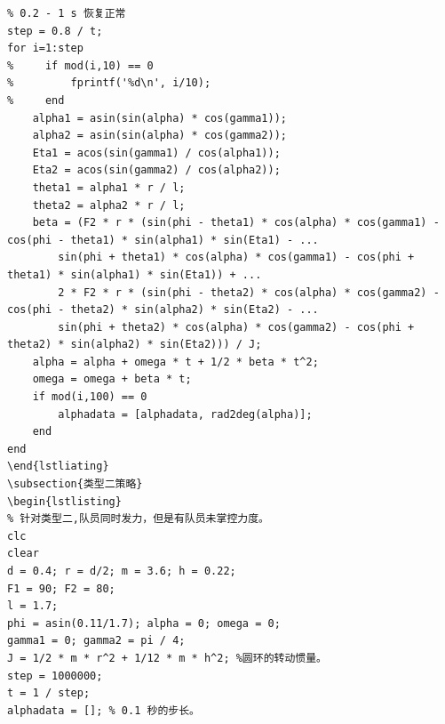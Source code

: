 \documentclass{cumcm}
\begin{document}
\begin{lstlisting}
% 0.2 - 1 s 恢复正常
step = 0.8 / t;
for i=1:step
%     if mod(i,10) == 0
%         fprintf('%d\n', i/10);
%     end
    alpha1 = asin(sin(alpha) * cos(gamma1));
    alpha2 = asin(sin(alpha) * cos(gamma2));
    Eta1 = acos(sin(gamma1) / cos(alpha1));
    Eta2 = acos(sin(gamma2) / cos(alpha2));
    theta1 = alpha1 * r / l;
    theta2 = alpha2 * r / l;
    beta = (F2 * r * (sin(phi - theta1) * cos(alpha) * cos(gamma1) - cos(phi - theta1) * sin(alpha1) * sin(Eta1) - ...
        sin(phi + theta1) * cos(alpha) * cos(gamma1) - cos(phi + theta1) * sin(alpha1) * sin(Eta1)) + ...
        2 * F2 * r * (sin(phi - theta2) * cos(alpha) * cos(gamma2) - cos(phi - theta2) * sin(alpha2) * sin(Eta2) - ...
        sin(phi + theta2) * cos(alpha) * cos(gamma2) - cos(phi + theta2) * sin(alpha2) * sin(Eta2))) / J;
    alpha = alpha + omega * t + 1/2 * beta * t^2;
    omega = omega + beta * t;
    if mod(i,100) == 0
        alphadata = [alphadata, rad2deg(alpha)];
    end
end
\end{lstliating}
\subsection{类型二策略}
\begin{lstlisting}
% 针对类型二,队员同时发力，但是有队员未掌控力度。
clc
clear
d = 0.4; r = d/2; m = 3.6; h = 0.22;
F1 = 90; F2 = 80;
l = 1.7;
phi = asin(0.11/1.7); alpha = 0; omega = 0;
gamma1 = 0; gamma2 = pi / 4;
J = 1/2 * m * r^2 + 1/12 * m * h^2; %圆环的转动惯量。
step = 1000000;
t = 1 / step;
alphadata = []; % 0.1 秒的步长。


\end{lstlisting}
\end{document}
